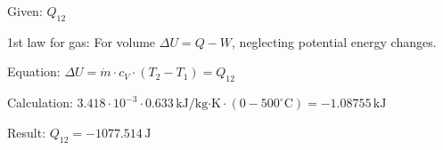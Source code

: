 Given: \( Q_{12} \)  

1st law for gas: For volume \( \Delta U = Q - W \), neglecting potential energy changes.  

Equation:  
\( \Delta U = \dot{m} \cdot c_V \cdot (T_2 - T_1) = Q_{12} \)  

Calculation:  
\( 3.418 \cdot 10^{-3} \cdot 0.633 \, \text{kJ/kg·K} \cdot (0 - 500^\circ \text{C}) = -1.08755 \, \text{kJ} \)  

Result:  
\( Q_{12} = -1077.514 \, \text{J} \)